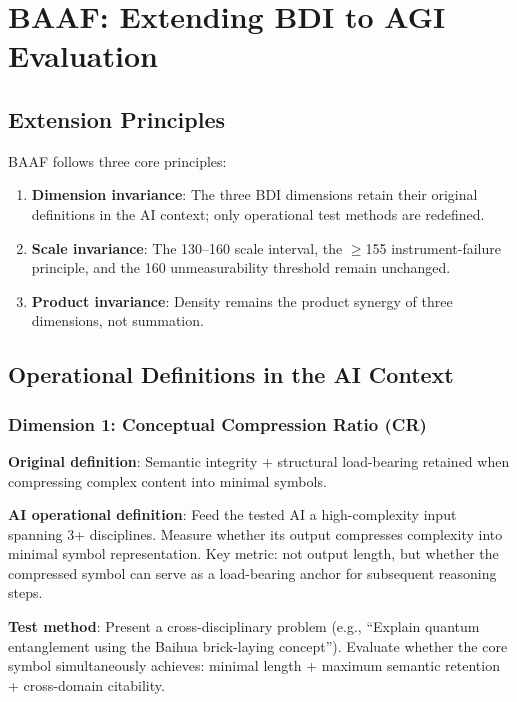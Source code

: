 \documentclass[11pt,a4paper]{article}
\theoremstyle{definition}
\theoremstyle{plain}
\newcommand{\BDI}{\textsc{BDI}}
\newcommand{\BAAF}{\textsc{BAAF}}
\newcommand{\CR}{\textsc{CR}}
\begin{document}
\section{\BAAF{}: Extending \BDI{} to AGI Evaluation}
\label{sec:baaf}

\subsection{Extension Principles}

\BAAF{} follows three core principles:

\begin{enumerate}[label=\textbf{P\arabic*:}]
    \item \textbf{Dimension invariance}: The three \BDI{} dimensions retain their original definitions in the AI context; only operational test methods are redefined.
    \item \textbf{Scale invariance}: The 130--160 scale interval, the $\geq$155 instrument-failure principle, and the 160 unmeasurability threshold remain unchanged.
    \item \textbf{Product invariance}: Density remains the product synergy of three dimensions, not summation.
\end{enumerate}

\subsection{Operational Definitions in the AI Context}

\subsubsection{Dimension 1: Conceptual Compression Ratio (\CR{})}

\textbf{Original definition}: Semantic integrity + structural load-bearing retained when compressing complex content into minimal symbols.

\textbf{AI operational definition}: Feed the tested AI a high-complexity input spanning 3+ disciplines. Measure whether its output compresses complexity into minimal symbol representation. Key metric: not output length, but whether the compressed symbol can serve as a load-bearing anchor for subsequent reasoning steps.

\textbf{Test method}: Present a cross-disciplinary problem (e.g., ``Explain quantum entanglement using the Baihua brick-laying concept''). Evaluate whether the core symbol simultaneously achieves: minimal length + maximum semantic retention + cross-domain citability.
\end{document}
